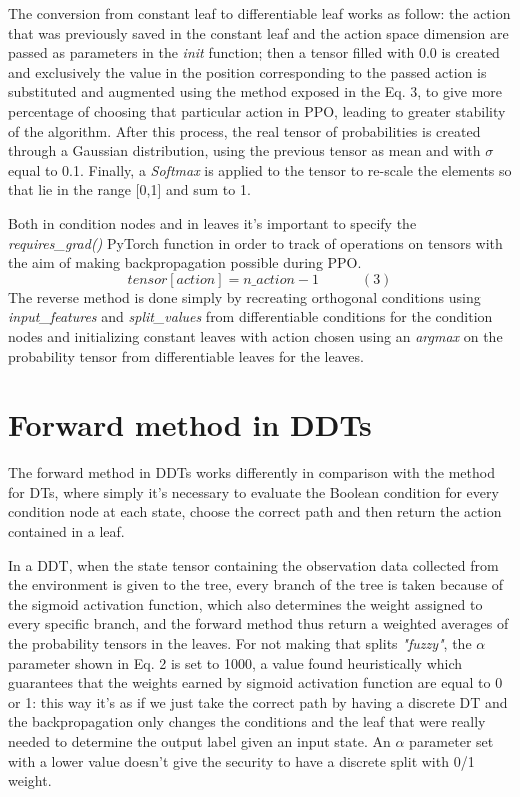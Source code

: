 The conversion from constant leaf to differentiable leaf works as follow: the action that was previously saved in the constant leaf and the action space dimension are passed as parameters in the \textit{init} function; then a tensor filled with 0.0 is created and exclusively the value in the position corresponding to the passed action is substituted and augmented using the method exposed in the Eq. 3, to give more percentage of choosing that particular action in PPO, leading to greater stability of the algorithm. After this process, the real tensor of probabilities is created through a Gaussian distribution, using the previous tensor as mean and with \(\sigma\) equal to 0.1. Finally, a \textit{Softmax} is applied to the tensor to re-scale the elements so that lie in the range [0,1] and sum to 1.

Both in condition nodes and in leaves it's important to specify the \textit{requires\_grad()} PyTorch function in order to track of operations on tensors with the aim of making backpropagation possible during PPO.
\[tensor[action] = n\_action-1\qquad\quad(3)\]
The reverse method is done simply by recreating orthogonal conditions using \textit{input\_features} and \textit{split\_values} from differentiable conditions for the condition nodes and initializing constant leaves with action chosen using an \textit{argmax} on the probability tensor from differentiable leaves for the leaves.


\section{Forward method in DDTs}
\label{sec:230}
The forward method in DDTs works differently in comparison with the method for DTs, where simply it's necessary to evaluate the Boolean condition for every condition node at each state, choose the correct path and then return the action contained in a leaf.

In a DDT, when the state tensor containing the observation data collected from the environment is given to the tree, every branch of the tree is taken because of the sigmoid activation function, which also determines the weight assigned to every specific branch, and the forward method thus return a weighted averages of the probability tensors in the leaves. For not making that splits \textit{"fuzzy"}, the \(\alpha\) parameter shown in Eq. 2 is set to 1000, a value found heuristically which guarantees that the weights earned by sigmoid activation function are equal to 0 or 1: this way it's as if we just take the correct path by having a discrete DT and the backpropagation only changes the conditions and the leaf that were really needed to determine the output label given an input state. An \(\alpha\) parameter set with a lower value doesn't give the security to have a discrete split with 0/1 weight.


